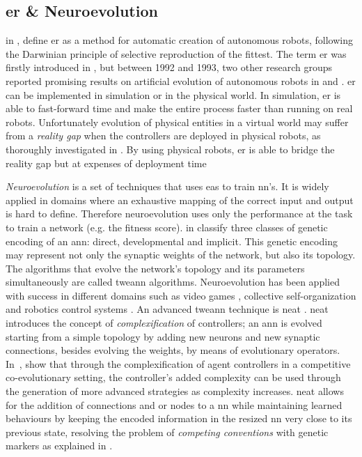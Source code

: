 \documentclass[conference]{IEEEtran}
\begin{document}
\subsection{\acrlong{er} \& Neuroevolution}
\citeauthor{nolfi2000evolutionary} in \cite{nolfi2000evolutionary}, define \gls{er} as a method for automatic creation of autonomous robots, following the Darwinian principle of selective reproduction of the fittest.
The term \acrlong{er} was firstly introduced in \cite{cli1993evolving}, but between 1992 and 1993, two other research groups reported promising results on artificial evolution of autonomous robots in \cite{lewis1992genetic} and \cite{nolfi1994evolve}.
\gls{er} can be implemented in simulation or in the physical world.
In simulation, \gls{er} is able to fast-forward time and make the entire process faster than running on real robots.
Unfortunately evolution of physical entities in a virtual world may suffer from a \textit{reality gap} when the controllers are deployed in physical robots, as thoroughly investigated in \cite{jakobi1995noise}.
By using physical robots, \gls{er} is able to bridge the reality gap but at expenses of deployment time

\textit{Neuroevolution} is a set of techniques that uses \glspl{ea} to train \gls{nn}'s.
It is widely applied in domains where an exhaustive mapping of the correct input and output is hard to define.
Therefore neuroevolution uses only the performance at the task to train a network (e.g. the fitness score).
\citeauthor{floreano2008neuroevolution} in \cite{floreano2008neuroevolution} classify three classes of genetic encoding of an \gls{ann}: direct, developmental and implicit.
This genetic encoding may represent not only the synaptic weights of the network, but also its topology.
The algorithms that evolve the network's topology and its parameters simultaneously are called \gls{tweann} algorithms.
Neuroevolution has been applied with success in different domains such as video games \cite{hausknecht2014neuroevolution, stanley2005real}, collective self-organization \cite{nitschke2008neuro, nitschke2010collective} and robotics control systems \cite{brooks1989robot, floreano1996evolution, kodjabachian1998evolution}.
An advanced \gls{tweann} technique is \gls{neat} \cite{stanley2002evolving}.
\gls{neat} introduces the concept of \textit{complexification} of controllers; an \gls{ann} is evolved starting from a simple topology by adding new neurons and new synaptic connections, besides evolving the weights, by means of evolutionary operators.
In~\cite{stanley2004competitive}, \citeauthor{stanley2004competitive} show that through the complexification of agent controllers in a competitive co-evolutionary setting, the controller's added complexity can be used through the generation of more advanced strategies as complexity increases.
\gls{neat} allows for the addition of connections and or nodes to a \gls{nn} while maintaining learned behaviours by keeping the encoded information in the resized \gls{nn} very close to its previous state, resolving the problem of \textit{competing conventions} with genetic markers as explained in \cite{floreano2008neuroevolution, stanley2002evolving}.
\end{document}
